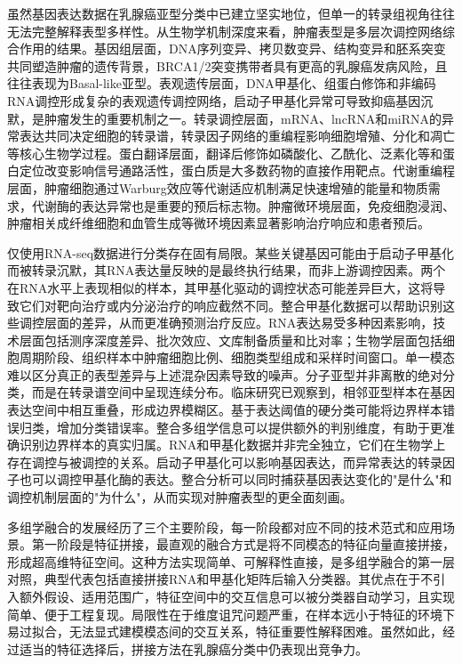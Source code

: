 虽然基因表达数据在乳腺癌亚型分类中已建立坚实地位，但单一的转录组视角往往无法完整解释表型多样性。从生物学机制深度来看，肿瘤表型是多层次调控网络综合作用的结果。基因组层面，DNA序列变异、拷贝数变异、结构变异和胚系突变共同塑造肿瘤的遗传背景，BRCA1/2突变携带者具有更高的乳腺癌发病风险，且往往表现为Basal-like亚型。表观遗传层面，DNA甲基化、组蛋白修饰和非编码RNA调控形成复杂的表观遗传调控网络，启动子甲基化异常可导致抑癌基因沉默，是肿瘤发生的重要机制之一。转录调控层面，mRNA、lncRNA和miRNA的异常表达共同决定细胞的转录谱，转录因子网络的重编程影响细胞增殖、分化和凋亡等核心生物学过程。蛋白翻译层面，翻译后修饰如磷酸化、乙酰化、泛素化等和蛋白定位改变影响信号通路活性，蛋白质是大多数药物的直接作用靶点。代谢重编程层面，肿瘤细胞通过Warburg效应等代谢适应机制满足快速增殖的能量和物质需求，代谢酶的表达异常也是重要的预后标志物。肿瘤微环境层面，免疫细胞浸润、肿瘤相关成纤维细胞和血管生成等微环境因素显著影响治疗响应和患者预后。

仅使用RNA-seq数据进行分类存在固有局限。某些关键基因可能由于启动子甲基化而被转录沉默，其RNA表达量反映的是最终执行结果，而非上游调控因素。两个在RNA水平上表现相似的样本，其甲基化驱动的调控状态可能差异巨大，这将导致它们对靶向治疗或内分泌治疗的响应截然不同。整合甲基化数据可以帮助识别这些调控层面的差异，从而更准确预测治疗反应。RNA表达易受多种因素影响，技术层面包括测序深度差异、批次效应、文库制备质量和比对率；生物学层面包括细胞周期阶段、组织样本中肿瘤细胞比例、细胞类型组成和采样时间窗口。单一模态难以区分真正的表型差异与上述混杂因素导致的噪声。分子亚型并非离散的绝对分类，而是在转录谱空间中呈现连续分布。临床研究已观察到，相邻亚型样本在基因表达空间中相互重叠，形成边界模糊区。基于表达阈值的硬分类可能将边界样本错误归类，增加分类错误率。整合多组学信息可以提供额外的判别维度，有助于更准确识别边界样本的真实归属。RNA和甲基化数据并非完全独立，它们在生物学上存在调控与被调控的关系。启动子甲基化可以影响基因表达，而异常表达的转录因子也可以调控甲基化酶的表达。整合分析可以同时捕获基因表达变化的"是什么"和调控机制层面的"为什么"，从而实现对肿瘤表型的更全面刻画。

多组学融合的发展经历了三个主要阶段，每一阶段都对应不同的技术范式和应用场景。第一阶段是特征拼接，最直观的融合方式是将不同模态的特征向量直接拼接，形成超高维特征空间。这种方法实现简单、可解释性直接，是多组学融合的第一层对照，典型代表包括直接拼接RNA和甲基化矩阵后输入分类器。其优点在于不引入额外假设、适用范围广，特征空间中的交互信息可以被分类器自动学习，且实现简单、便于工程复现。局限性在于维度诅咒问题严重，在样本远小于特征的环境下易过拟合，无法显式建模模态间的交互关系，特征重要性解释困难。虽然如此，经过适当的特征选择后，拼接方法在乳腺癌分类中仍表现出竞争力。

